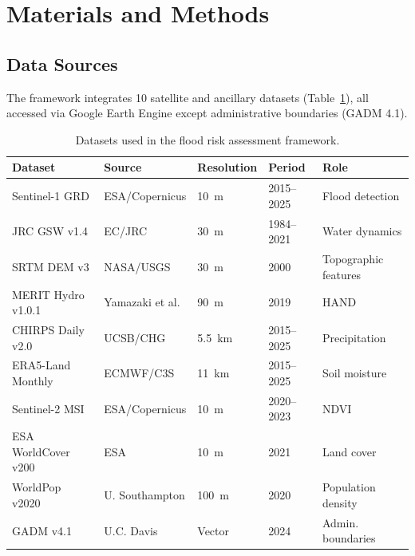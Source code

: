 \documentclass{article}
\begin{document}
\section{Materials and Methods}
\label{sec:methods}

\subsection{Data Sources}

The framework integrates 10 satellite and ancillary datasets (Table~\ref{tab:data_sources}), all accessed via Google Earth Engine \citep{Gorelick2017} except administrative boundaries (GADM 4.1).

\begin{table}[htbp]
\caption{Datasets used in the flood risk assessment framework.}
\label{tab:data_sources}
\centering
\footnotesize
\begin{tabular}{lllll}
\toprule
\textbf{Dataset} & \textbf{Source} & \textbf{Resolution} & \textbf{Period} & \textbf{Role} \\
\midrule
Sentinel-1 GRD & ESA/Copernicus & \SI{10}{\metre} & 2015--2025 & Flood detection \\
JRC GSW v1.4 & EC/JRC & \SI{30}{\metre} & 1984--2021 & Water dynamics \\
SRTM DEM v3 & NASA/USGS & \SI{30}{\metre} & 2000 & Topographic features \\
MERIT Hydro v1.0.1 & Yamazaki et al. & \SI{90}{\metre} & 2019 & HAND \\
CHIRPS Daily v2.0 & UCSB/CHG & \SI{5.5}{\kilo\metre} & 2015--2025 & Precipitation \\
ERA5-Land Monthly & ECMWF/C3S & \SI{11}{\kilo\metre} & 2015--2025 & Soil moisture \\
Sentinel-2 MSI & ESA/Copernicus & \SI{10}{\metre} & 2020--2023 & NDVI \\
ESA WorldCover v200 & ESA & \SI{10}{\metre} & 2021 & Land cover \\
WorldPop v2020 & U. Southampton & \SI{100}{\metre} & 2020 & Population density \\
GADM v4.1 & U.C. Davis & Vector & 2024 & Admin. boundaries \\
\bottomrule
\end{tabular}
\end{table}
\end{document}
